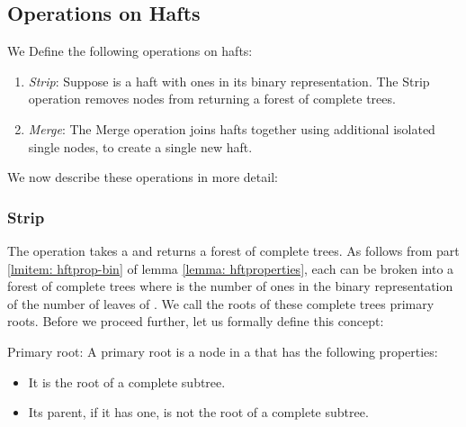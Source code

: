 \documentclass[11pt, letter]{article}
\begin{document}
\subsection{Operations on Hafts}
We Define the following operations on hafts:
\begin{enumerate}
\item \emph{Strip}: Suppose  is a haft with  ones in its binary representation. The Strip operation removes 
 nodes from  returning  a forest of  complete trees. 

\item \emph{Merge}: The Merge operation joins  hafts together using additional isolated single nodes,
to create a single new haft.
\end{enumerate}

We now describe these operations in more detail:

\subsubsection{Strip}
\label{subsec: haftstrip}
The operation  takes a   and returns a forest  of complete trees.  As follows from part \ref{lmitem: hftprop-bin} of lemma \ref{lemma: hftproperties}, each  can be broken into a forest of  complete trees where  is the number of ones in the binary representation of the number of leaves of . We call the roots of these complete trees primary roots. Before we proceed further, let us formally define this concept:

\begin{description}
\item{Primary root:} A primary root is a node in a  that has the following properties:
\begin{itemize}
\item It is the root of a complete subtree.
\item Its parent, if it has one, is not the root of a complete subtree.
\end{itemize}
\end{description}
\end{document}
